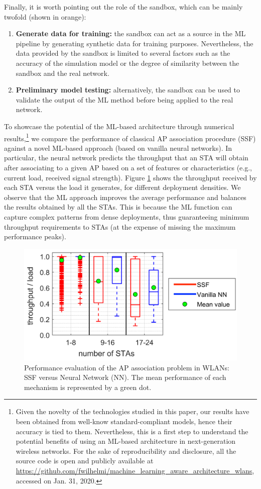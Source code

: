 \documentclass{article}
\begin{document}
Finally, it is worth pointing out the role of the sandbox, which can be mainly twofold (shown in orange):
\begin{enumerate}
	\item \textbf{Generate data for training:} the sandbox can act as a source in the ML pipeline by generating synthetic data for training purposes. Nevertheless, the data provided by the sandbox is limited to several factors such as the accuracy of the simulation model or the degree of similarity between the sandbox and the real network. %
	\item \textbf{Preliminary model testing:} alternatively, the sandbox can be used to validate the output of the ML method before being applied to the real network.
\end{enumerate}

To showcase the potential of the ML-based architecture through numerical results,\footnote{Given the novelty of the technologies studied in this paper, our results have been obtained from well-know standard-compliant models, hence their accuracy is tied to them. Nevertheless, this is a first step to understand the potential benefits of using an ML-based architecture in next-generation wireless networks. For the sake of reproducibility and disclosure, all the source code is open and publicly available at \href{https://github.com/fwilhelmi/machine_learning_aware_architecture_wlans}{https://github.com/fwilhelmi/machine\_learning\_aware\_architecture\_wlans}, accessed on Jan. 31, 2020.} we compare the performance of classical AP association procedure (SSF) against a novel ML-based approach (based on vanilla neural networks). In particular, the neural network predicts the throughput that an STA will obtain after associating to a given AP based on a set of features or characteristics (e.g., current load, received signal strength). Figure \ref{fig:results_use_case} shows the throughput received by each STA versus the load it generates, for different deployment densities. We observe that the ML approach improves the average performance and balances the results obtained by all the STAs. This is because the ML function can capture complex patterns from dense deployments, thus guaranteeing minimum throughput requirements to STAs (at the expense of missing the maximum performance peaks).

\begin{figure}[ht!]
	\centering
	\includegraphics[width=.7\columnwidth]{output_use_case_ap_association}
	\caption{Performance evaluation of the AP association problem in WLANs: SSF versus Neural Network (NN). The mean performance of each mechanism is represented by a green dot.}
	\label{fig:results_use_case}
\end{figure}
\end{document}
